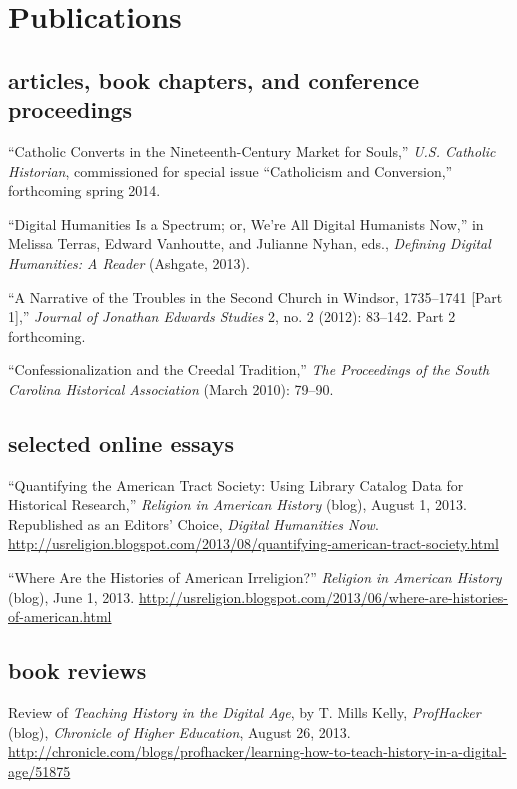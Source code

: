 \documentclass[11pt]{article}
\begin{document}
\section{Publications}

\subsection{articles, book chapters, and conference proceedings}

``Catholic Converts in the Nineteenth-Century Market for Souls,'' \emph{U.S.  
Catholic Historian}, commissioned for special issue ``Catholicism and 
Conversion,'' forthcoming spring 2014.

``Digital Humanities Is a Spectrum; or, We're All Digital Humanists
Now,'' in Melissa Terras, Edward Vanhoutte, and Julianne Nyhan, eds.,
\emph{Defining Digital Humanities: A Reader} (Ashgate, 2013).

``A Narrative of the Troubles in the Second Church in Windsor,
1735--1741 {[}Part 1{]},'' \emph{Journal of Jonathan Edwards Studies} 2,
no. 2 (2012): 83--142. Part 2 forthcoming.

``Confessionalization and the Creedal Tradition,'' \emph{The Proceedings
of the South Carolina Historical Association} (March 2010): 79--90.

\subsection{selected online essays}

``Quantifying the American Tract Society: Using Library Catalog Data for 
Historical Research,'' \emph{Religion in American History} (blog), August 1, 
2013. Republished as an Editors' Choice, \emph{Digital Humanities 
Now}. \href{http://usreligion.blogspot.com/2013/08/quantifying-american-tract-society.html}{http://usreligion.blogspot.com/2013/08/quantifying-american-tract-society.html}

``Where Are the Histories of American Irreligion?'' \emph{Religion in
American History} (blog), June 1,
2013. \href{http://usreligion.blogspot.com/2013/06/where-are-histories-of-american.html}{http://usreligion.blogspot.com/2013/06/where-are-histories-of-american.html}

\subsection{book reviews}

Review of \emph{Teaching History in the Digital Age}, by T. Mills Kelly, 
\emph{ProfHacker} (blog), \emph{Chronicle of Higher Education}, August 26, 
2013. 
\href{http://chronicle.com/blogs/profhacker/learning-how-to-teach-history-in-a-digital-age/51875}{http://chronicle.com/blogs/profhacker/learning-how-to-teach-history-in-a-digital-age/51875}
\end{document}
